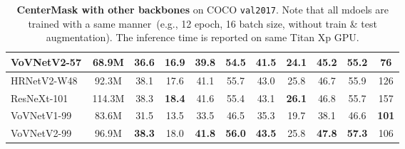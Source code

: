 \documentclass[10pt,twocolumn,letterpaper]{article}
\begin{document}
\begin{table*}[t]
{\begin{tabular}{l|c|cccc|cccc|c}
VoVNetV2-57 & 68.9M   & \textbf{36.6} &\textbf{16.9}      &\textbf{39.8}      &\textbf{54.5}      & \textbf{41.5}                 &\textbf{24.1}                       &\textbf{45.2}                       &\textbf{55.2}                       & 76        \\ \hline
HRNetV2-W48~\cite{sun2019high} & 92.3M   & 38.1 & 17.6   & 41.1 & 55.7   & 43.0                 & 25.8                    & 46.7                  & 55.9                  & 126        \\
ResNeXt-101~\cite{xie2017aggregated} & 114.3M  & 38.3 & \textbf{18.4} & 41.6 & 55.4 & 43.1                 & \textbf{26.1}                  & 46.8                  & 55.7                  & 157       \\
VoVNetV1-99~\cite{lee2019energy} &  83.6M  & 31.5 & 13.5   & 33.5 & 46.5   & 35.3                 & 19.7                  & 38.1                  & 46.6                  & \textbf{101} \\       
VoVNetV2-99 & 96.9M   & \textbf{38.3} & 18.0   & \textbf{41.8} & \textbf{56.0}   & \textbf{43.5}                 & 25.8                  & \textbf{47.8}                  & \textbf{57.3}                  & 106      
\end{tabular}
}
  \caption{\textbf{CenterMask with other backbones} on COCO \texttt{val2017}. Note that all mdoels are trained with a same manner~(e.g., 12 epoch, 16 batch size, without train \& test augmentation). The inference time is reported on same Titan Xp GPU.}
  \label{tab:backbone}\vspace{-0.4cm}
\end{table*}
\end{document}
